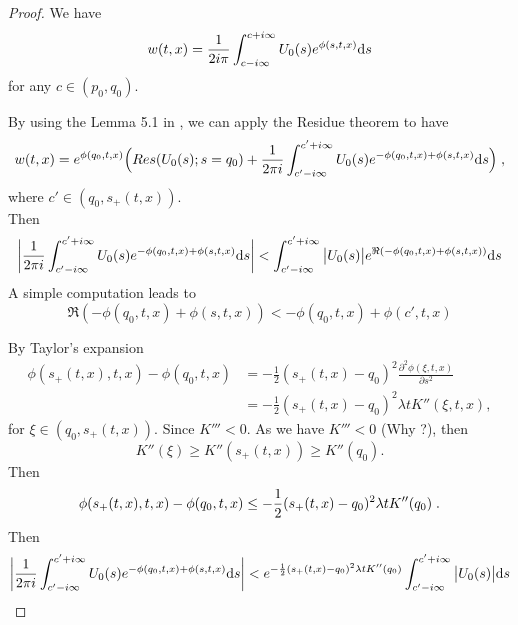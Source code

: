 \documentclass[11pt]{amsart}
\begin{document}
\begin{proof}
    We have
    \begin{equation}
         w(t,x) = \frac{1}{2i\pi} \int_{c - i \infty}^{c + i \infty} U_0(s) e^{\phi(s,t,x)}\mathrm ds 
    \end{equation}
    for any $c \in (p_0, q_0)$.
    
    By using the Lemma 5.1 in \cite{doumic2016time}, we can apply the Residue theorem to have
    \begin{equation*}
        w(t,x) = e^{\phi(q_0, t, x)} \Big( Res(U_0(s); s = q_0) + \frac{1}{2\pi i} \int_{c' - i \infty}^{c' + i \infty} U_0(s) e^{-\phi(q_0, t, x) + \phi(s, t, x)} \mathrm ds \Big)
        \; ,
    \end{equation*}
    where $c' \in (q_0, s_+(t,x))$.  \\
    
    Then 
    \begin{equation*}
        \bigg| \frac{1}{2\pi i} \int_{c' - i \infty}^{c' + i \infty} U_0(s) e^{-\phi(q_0, t, x) + \phi(s, t, x)} \mathrm ds \bigg|
        < 
        \int_{c' - i \infty}^{c' + i \infty} \big|U_0(s)\big| e^{\Re(-\phi(q_0, t, x) + \phi(s, t, x))} \mathrm ds 
    \end{equation*}
    A simple computation leads to 
    \begin{equation*}
    \Re(-\phi(q_0, t, x)+ \phi(s, t, x)) < -\phi(q_0, t, x)+ \phi(c', t, x) 
    \end{equation*}
    
    By Taylor's expansion
    \begin{align*}
        \phi(s_+(t,x), t,x) - \phi(q_0, t, x) 
        &= -\frac{1}{2}(s_+(t,x) - q_0)^2 \frac{\partial^2 \phi(\xi, t, x)}{\partial s^2} \\
        &= -\frac{1}{2}(s_+(t,x) - q_0)^2 \lambda t K''(\xi, t, x),
    \end{align*}
    for $\xi \in (q_0, s_+(t,x))$. Since $K''' < 0$. 
    As we have $K''' < 0$ (Why ?), then 
        $$K''(\xi) \geq K''(s_+(t,x)) \geq K''(q_0).$$
    Then 
        \begin{equation*}
               \phi(s_+(t,x), t,x) - \phi(q_0, t, x) \leq -\frac{1}{2}(s_+(t,x) - q_0)^2 \lambda tK''(q_0)
               \; .
        \end{equation*}
    Then 
    \begin{equation*}
        \bigg| \frac{1}{2\pi i} \int_{c' - i \infty}^{c' + i \infty} U_0(s) e^{-\phi(q_0, t, x) + \phi(s, t, x)} \mathrm ds \bigg| 
        < 
        e^{-\frac{1}{2}(s_+(t,x) - q_0)^2 \lambda tK''(q_0) }\int_{c' - i \infty}^{c' + i \infty} \big|U_0(s)\big| \mathrm ds
    \end{equation*}
\end{proof}
\end{document}
